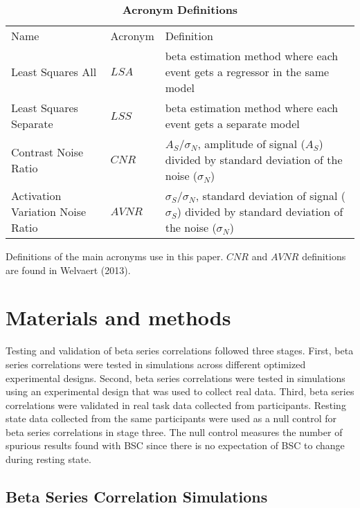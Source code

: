 \documentclass[10pt,letterpaper]{article}
\newlength\savedwidth
\newcommand\thickhline{\noalign{\global\savedwidth\arrayrulewidth\global\arrayrulewidth 2pt}%
\hline
\noalign{\global\arrayrulewidth\savedwidth}}
\begin{document}
\begin{table}[H]
  \begin{adjustwidth}{0in}{0in} %
  \centering
  \caption{
  {\bf Acronym Definitions}}
  \begin{tabular}{|l|l|p{60mm}|}
  \hline
  Name & Acronym & Definition\\ \thickhline
  Least Squares All & $LSA$ & beta estimation method where each event gets a regressor in the same model\\ \hline
  Least Squares Separate & $LSS$ & beta estimation method where each event gets a separate model\\ \hline
  Contrast Noise Ratio & $CNR$ & $A_S/\sigma_N$, amplitude of signal ($A_S$) divided by standard deviation of the noise ($\sigma_N$)\\ \hline
  Activation Variation Noise Ratio & $AVNR$ & $\sigma_S/\sigma_N$, standard deviation of signal ($\sigma_S$) divided by standard deviation of the noise ($\sigma_N$)\\ \hline
  \end{tabular}

  Definitions of the main acronyms use in this paper.
  $CNR$ and $AVNR$ definitions are found in Welvaert (2013)\cite{Welvaert2013a}.
  \label{table0}
  \end{adjustwidth}
  \end{table}

\section*{Materials and methods}
\label{methods}

Testing and validation of beta series correlations followed three stages.
First, beta series correlations were tested in simulations across different
optimized experimental designs.
Second, beta series correlations were tested in simulations using an experimental
design that was used to collect real data.
Third, beta series correlations were validated in real task data collected from
participants.
Resting state data collected from the same participants were used as a null
control for beta series correlations in stage three.
The null control measures the number of spurious results found
with BSC since there is no expectation of BSC to change
during resting state.

\subsection*{Beta Series Correlation Simulations}
\label{methods:bsc-simulations}
\end{document}
